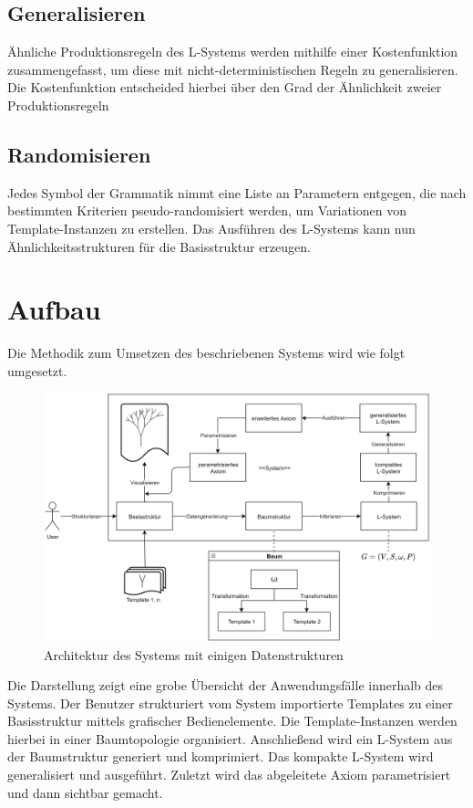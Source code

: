 \subsection*{Generalisieren}
Ähnliche Produktionsregeln des L-Systems werden mithilfe einer Kostenfunktion zusammengefasst, um diese mit
nicht-deterministischen Regeln zu generalisieren.
Die Kostenfunktion entscheided hierbei über den Grad der Ähnlichkeit zweier Produktionsregeln

\subsection*{Randomisieren}
Jedes Symbol der Grammatik nimmt eine Liste an Parametern entgegen, die nach bestimmten Kriterien pseudo-randomisiert
werden, um Variationen von Template-Instanzen zu erstellen.
Das Ausführen des L-Systems kann nun Ähnlichkeitsstrukturen für die Basisstruktur erzeugen.

\section{Aufbau}
Die Methodik zum Umsetzen des beschriebenen Systems wird wie folgt umgesetzt.

\begin{figure}[H]
    \centering
    \includegraphics[width=14cm]{../images/System.PNG}
    \caption[Systemarchitektur]{Architektur des Systems mit einigen Datenstrukturen}
\end{figure}

Die Darstellung zeigt eine grobe Übersicht der Anwendungsfälle innerhalb des Systems.
Der Benutzer strukturiert vom System importierte Templates zu einer Basisstruktur mittels grafischer Bedienelemente.
Die Template-Instanzen werden hierbei in einer Baumtopologie organisiert.
Anschließend wird ein L-System aus der Baumstruktur generiert und komprimiert.
Das kompakte L-System wird generalisiert und ausgeführt.
Zuletzt wird das abgeleitete Axiom parametrisiert und dann sichtbar gemacht.